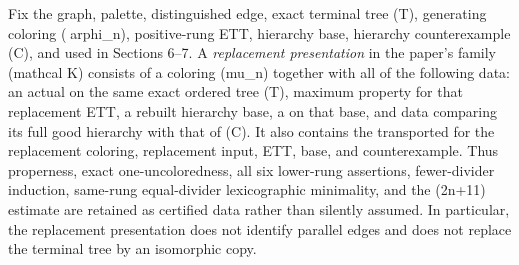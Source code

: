 \begin{definition}
Fix the graph, palette, distinguished edge, exact terminal tree (T),
generating coloring (arphi_n), positive-rung ETT, hierarchy base,
hierarchy counterexample (C), and
 used in Sections 6--7.
A \emph{replacement presentation} in the paper's family (mathcal K)
consists of a coloring (mu_n) together with all of the following data:
an actual  on the same exact
ordered tree (T), maximum property for that replacement ETT, a rebuilt
hierarchy base, a  on that base, and
 data comparing its full good hierarchy with
that of (C).  It also contains the transported
 for the replacement
coloring, replacement input, ETT, base, and counterexample.  Thus
properness, exact one-uncoloredness, all six lower-rung assertions,
fewer-divider induction, same-rung equal-divider lexicographic minimality,
and the (2n+11) estimate are retained as certified data rather than
silently assumed.  In particular, the replacement presentation does not
identify parallel edges and does not replace the terminal tree by an
isomorphic copy.
\end{definition}
